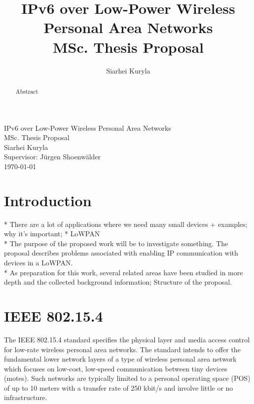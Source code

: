 \documentclass[12pt, titlepage, a4paper]{report}
\title{IPv6 over Low-Power Wireless Personal Area Networks\\ MSc. Thesis Proposal}
\author{Siarhei Kuryla}
\begin{document}
\begin{titlepage}
 
\begin{center}
 
 
\huge IPv6 over Low-Power Wireless Personal Area Networks\\ [0.5cm]
 
\Large MSc. Thesis Proposal\\ [0.5cm]
Siarhei Kuryla\\ [0.5cm]

\large Supervisor: J\"urgen Shoenw\"alder\\[0.5cm]
{\large \today}

 
\end{center} 
\end{titlepage}

\newpage
\thispagestyle{empty}

\newpage
\begin{abstract}
Abstract
\end{abstract}

\newpage
\tableofcontents
\listoffigures 
\newpage 

\chapter{Introduction}
* There are a lot of applications where we need many small devices + examples; why it's important;
* LoWPAN\\
* The purpose of the proposed work will be to investigate something. The proposal describes problems associated with enabling IP communication with devices in a LoWPAN.\\
* As preparation for this work, several related areas have been studied in more
depth and the collected background information; Structure of the proposal.\\

\chapter{IEEE 802.15.4}\label{ch:ieee802.15.4}
The IEEE 802.15.4 standard \cite{ieee802.15.4} specifies the physical layer and media access control for low-rate wireless personal area networks. The standard intends to offer the fundamental lower network layers of a type of wireless personal area network which focuses on low-cost, low-speed communication between tiny devices (motes). Such networks are typically limited to a personal operating space (POS) of up to 10 meters with a transfer rate of 250 kbit/s and involve little or no infrastructure. 
\end{document}
